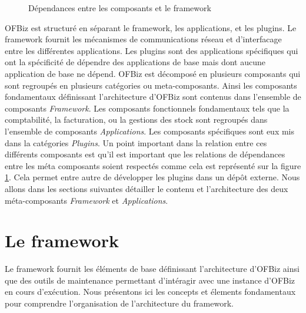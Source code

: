 \documentclass[a4paper, 11pt]{report}
\begin{document}
\begin{figure}
  \caption{Dépendances entre les composants et le framework}
  \label{fig:compdep}
\end{figure}

OFBiz est structuré en séparant le framework, les applications, et les
plugins.  Le framework fournit les mécanismes de communications réseau
et d'interfacage entre les différentes applications.  Les plugins sont
des applications spécifiques qui ont la spécificité de dépendre des
applications de base mais dont aucune application de base ne dépend.
OFBiz est décomposé en plusieurs composants qui sont regroupés en
plusieurs catégories ou meta-composants. Ainsi les composants
fondamentaux définissant l'architecture d'OFBiz sont contenus dans
l'ensemble de composants \emph{Framework}.  Les composants
fonctionnels fondamentaux tels que la comptabilité, la facturation, ou
la gestions des stock sont regroupés dans l'ensemble de composants
\emph{Applications}.  Les composants spécifiques sont eux mis dans la
catégories \emph{Plugins}. Un point important dans la relation entre
ces différents composants est qu'il est important que les relations de
dépendances entre les méta composants soient respectés comme cela est
représenté sur la figure \ref{fig:compdep}.  Cela permet entre autre
de développer les plugins dans un dépôt externe.  Nous allons dans les
sections suivantes détailler le contenu et l'architecture des deux
méta-composants \emph{Framework} et \emph{Applications}.

\section{Le framework}

Le framework fournit les éléments de base définissant l'architecture
d'OFBiz ainsi que des outils de maintenance permettant d'intéragir
avec une instance d'OFBiz en cours d'exécution. Nous présentons ici
les concepts et élements fondamentaux pour comprendre l'organisation
de l'architecture du framework.
\end{document}
